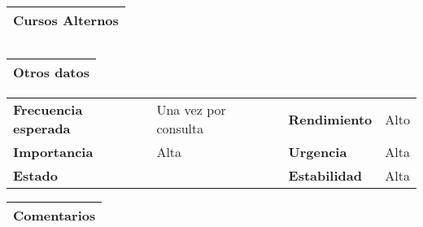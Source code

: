 \documentclass[11pt,a4paper]{article}
\begin{document}
\begin{table}[H]
	\begin{tabularx}{\textwidth}{X}
		\textbf{Cursos Alternos}\\ \hline
	\end{tabularx}
	\begin{tabularx}{\textwidth}{cX}
	\end{tabularx}
\end{table}

\begin{table}[H]
	\begin{tabularx}{\textwidth}{X}
		\textbf{Otros datos}\\ \hline
	\end{tabularx}
	\begin{tabularx}{\textwidth}{lXlX}
		\textbf{Frecuencia esperada} & Una vez por consulta & \textbf{Rendimiento} & Alto \\
		\textbf{Importancia} & Alta & \textbf{Urgencia} & Alta \\
		\textbf{Estado} &  & \textbf{Estabilidad} & Alta\\
	\end{tabularx}
	
	\begin{tabularx}{\textwidth}{X}
		\textbf{Comentarios}\\ \hline
	\end{tabularx}
\end{table}

\newpage

\end{document}
